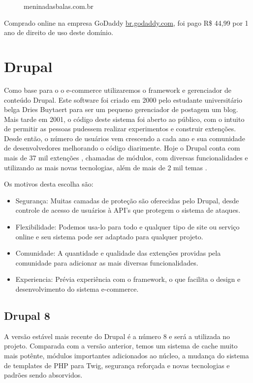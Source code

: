 \begin{figure}
  \centering
    \large
    meninadasbalas.com.br
\end{figure}

Comprado online na empresa GoDaddy \url{br.godaddy.com}, foi pago R\$ 44,99 por 1 ano de direito de uso deste domínio.

\section{Drupal}

Como base para o o e-commerce utilizaremos o framework e gerenciador de conteúdo Drupal.  Este software foi criado em 2000 pelo estudante universitário belga Dries Buytaert para ser um pequeno gerenciador de postagem um blog. Mais tarde em 2001, o código deste sistema foi aberto ao público, com o intuito de permitir as pessoas pudessem realizar experimentos e construir extenções. Desde então, o número de usuários vem crescendo a cada ano e sua comunidade de desenvolvedores melhorando o código diarimente. Hoje o Drupal conta com mais de 37 mil extenções \cite{DrupalModules}, chamadas de módulos, com diversas funcionalidades e utilizando as mais novas tecnologias, além de mais de 2 mil temas \cite{DrupalTheme}.

Os motivos desta escolha são:

\begin{itemize}
  \item Segurança: Muitas camadas de proteção são oferecidas pelo Drupal, desde controle de acesso de usuários à API's que protegem o sistema de ataques.
  \item Flexibilidade: Podemos usa-lo para todo e qualquer tipo de site ou serviço online e seu sistema pode ser adaptado para qualquer projeto.
  \item Comunidade: A quantidade e qualidade das extenções providas pela comunidade para adicionar as mais diversas funcionalidades.
  \item Experiencia: Prévia experiência com o framework, o que facilita o design e desenvolvimento do sistema e-commerce.
\end{itemize}

\subsection{Drupal 8}

A versão estável mais recente do Drupal é a número 8 e será a utilizada no projeto. Comparada com a versão anterior, temos um sistema de cache muito mais potênte, módulos importantes adicionados ao núcleo, a mudança do sistema de templates de PHP para Twig, segurança reforçada e novas tecnologias e padrões sendo absorvidos. 

